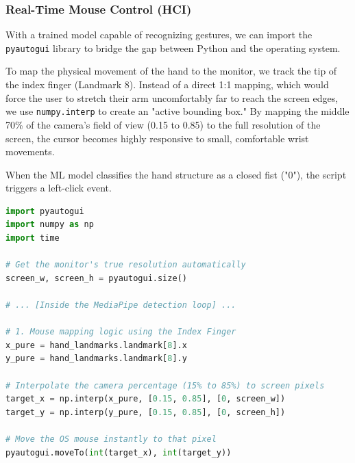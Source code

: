 \subsubsection{Real-Time Mouse Control (HCI)}
With a trained model capable of recognizing gestures, we can import the \texttt{pyautogui} library to bridge the gap between Python and the operating system. 

To map the physical movement of the hand to the monitor, we track the tip of the index finger (Landmark 8). Instead of a direct 1:1 mapping, which would force the user to stretch their arm uncomfortably far to reach the screen edges, we use \texttt{numpy.interp} to create an "active bounding box." By mapping the middle 70\% of the camera's field of view (0.15 to 0.85) to the full resolution of the screen, the cursor becomes highly responsive to small, comfortable wrist movements. 

When the ML model classifies the hand structure as a closed fist ("0"), the script triggers a left-click event.

\begin{lstlisting}[language=Python, title=HCI Mouse Control Integration with Interpolation]
import pyautogui
import numpy as np
import time

# Get the monitor's true resolution automatically
screen_w, screen_h = pyautogui.size()

# ... [Inside the MediaPipe detection loop] ...

# 1. Mouse mapping logic using the Index Finger
x_pure = hand_landmarks.landmark[8].x
y_pure = hand_landmarks.landmark[8].y

# Interpolate the camera percentage (15% to 85%) to screen pixels
target_x = np.interp(x_pure, [0.15, 0.85], [0, screen_w])
target_y = np.interp(y_pure, [0.15, 0.85], [0, screen_h])

# Move the OS mouse instantly to that pixel
pyautogui.moveTo(int(target_x), int(target_y))
\end{lstlisting}


\vspace{0.6cm}
\noindent{}
\vspace{0.4cm}